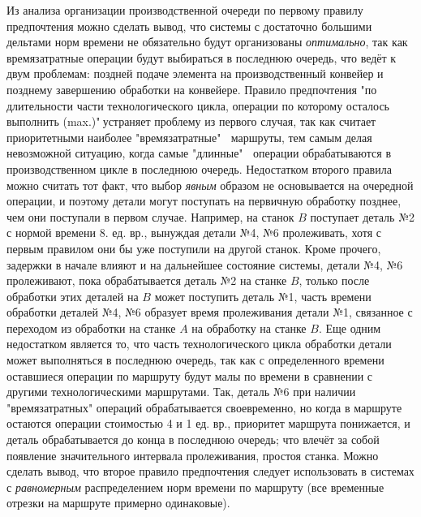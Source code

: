 \documentclass[a4paper,12pt]{article}
\begin{document}
\begin{flushleft}
\begin{enumerate}
  \newline\linebreak
  Из анализа организации производственной очереди по первому правилу предпочтения можно сделать вывод, что системы с достаточно большими дельтами норм времени не обязательно будут организованы \textit{оптимально}, так как времязатратные операции будут выбираться в последнюю очередь, что ведёт к двум проблемам: поздней подаче элемента на производственный конвейер и позднему завершению обработки на конвейере.
  \newline\linebreak\linebreak\linebreak
  Правило предпочтения "по длительности части технологического цикла, операции по которому осталось выполнить (max.)"$~$устраняет проблему из первого случая, так как считает приоритетными наиболее "времязатратные" $~$ маршруты, тем самым делая невозможной ситуацию, когда самые "длинные" $~$ операции обрабатываются в производственном цикле в последнюю очередь.
  \newline\linebreak
  Недостатком второго правила можно считать тот факт, что выбор \textit{явным} образом не основывается на очередной операции, и поэтому детали могут поступать на первичную обработку позднее, чем они поступали в первом случае. Например, на станок $B$ поступает деталь №2 с нормой времени 8. ед. вр., вынуждая детали №4, №6 пролеживать, хотя с первым правилом они бы уже поступили на другой станок. Кроме прочего, задержки в начале влияют и на дальнейшее состояние системы, детали №4, №6 пролеживают, пока обрабатывается деталь №2 на станке $B$, только после обработки этих деталей на $B$ может поступить деталь №1, часть времени обработки деталей №4, №6 образует время пролеживания детали №1, связанное с переходом из обработки на станке $A$ на обработку на станке $B$.
  \newline\linebreak
  Еще одним недостатком является то, что часть технологического цикла обработки детали может выполняться в последнюю очередь, так как с определенного времени оставшиеся операции по маршруту будут малы по времени в сравнении с другими технологическими маршрутами. Так, деталь №6 при наличии "времязатратных" операций обрабатывается своевременно, но когда в маршруте остаются операции стоимостью 4 и 1 ед. вр., приоритет маршрута понижается, и деталь обрабатывается до конца в последнюю очередь; что влечёт за собой появление значительного интервала пролеживания, простоя станка.
  \newline\linebreak
  Можно сделать вывод, что второе правило предпочтения следует использовать в системах с \textit{равномерным} распределением норм времени по маршруту (все временные отрезки на маршруте примерно одинаковые).
\end{enumerate}
\end{flushleft}
\end{document}
